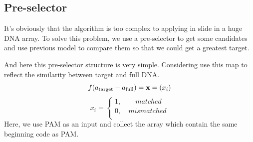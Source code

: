 \documentclass[a4paper,10pt]{article}
\begin{document}
	\subsection{Pre-selector}
	It’s obviously that the algorithm is too complex to applying in slide in a huge DNA array. To solve this problem, we use a pre-selector to get some candidates and use previous model to compare them so that we could get a greatest target.\par
	And here this pre-selector structure is very simple.
	Considering use this map to reflect the similarity between target and full DNA.
	\[f({a_{{\rm{target}}}} - {a_{{\rm{full}}}}) = {\bf{x}} = ({x_i})\]
	\[{x_i} = \left\{ {\begin{array}{*{20}{c}}
		{1,\quad \quad matched}  \\
		{0,\quad mismatched}  \\
		\end{array}} \right.\]
	Here, we use PAM as an input and collect the array which contain the same beginning code as PAM.
\end{document}
